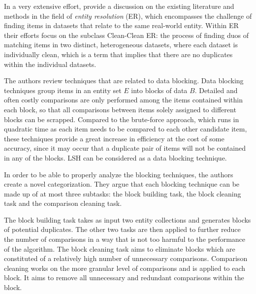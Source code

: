 In a very extensive effort, \cite{Papadakis2016} provide a discussion on the existing literature and methods in the field of \textit{entity resolution} (ER), which encompasses the challenge of finding items in datasets that relate to the same real-world entity. Within ER their efforts focus on the subclass Clean-Clean ER: the process of finding duos of matching items in two distinct, heterogeneous datasets, where each dataset is individually clean, which is a term that implies that there are no duplicates within the individual datasets. 

The authors review techniques that are related to data blocking. Data blocking techniques  group items in an entity set $E$ into blocks of data $B$. Detailed and often costly comparisons are only performed among the items contained within each block, so that all comparisons between items solely assigned to different blocks can be scrapped. Compared to the brute-force approach, which runs in quadratic time as each item needs to be compared to each other candidate item, these techniques provide a great increase in efficiency at the cost of some accuracy, since it may occur that a duplicate pair of items will not be contained in any of the blocks. LSH can be considered as a data blocking technique.

In order to be able to properly analyze the blocking techniques, the authors create a novel categorization. They argue that each blocking technique can be made up of at most three subtasks: the block building task, the block cleaning task and the comparison cleaning task.

The block building task takes as input two entity collections and generates blocks of potential duplicates. %
The other two tasks are then applied to further reduce the number of comparisons in a way that is not too harmful to the performance of the algorithm. The block cleaning task aims to eliminate blocks which are constituted of a relatively high number of unnecessary comparisons. Comparison cleaning works on the more granular level of comparisons and is applied to each block. It aims to remove all unnecessary and redundant comparisons within the block.

